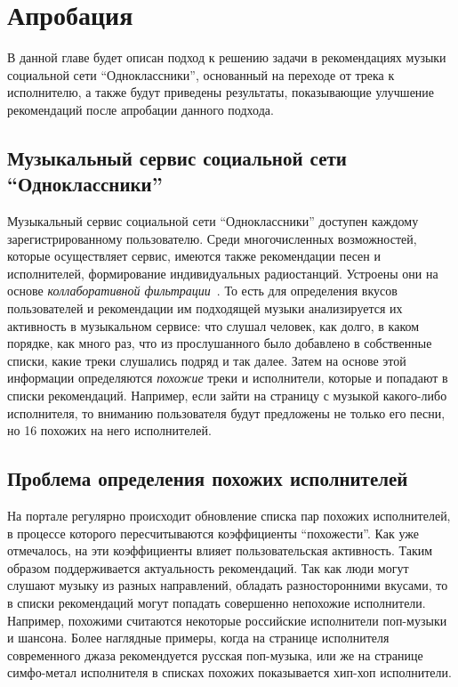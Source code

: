 \chapter{Апробация} 
\label{approbation}

В данной главе будет описан подход к решению задачи в рекомендациях музыки социальной сети ``Одноклассники'', основанный на переходе
от трека к исполнителю, а также будут приведены результаты, показывающие улучшение рекомендаций после апробации данного подхода.

\section{Музыкальный сервис социальной сети “Одноклассники”}

Музыкальный сервис социальной сети ``Одноклассники'' доступен каждому зарегистрированному пользователю. Среди многочисленных возможностей, 
которые осуществляет сервис, имеются также рекомендации песен и исполнителей, формирование индивидуальных радиостанций. Устроены они на 
основе \emph{коллаборативной фильтрации}~\cite{bugaychenko}. То есть для определения вкусов пользователей и рекомендации им подходящей музыки анализируется 
их активность в музыкальном сервисе: что слушал человек, как долго, в каком порядке, как много раз, что из прослушанного было добавлено 
в собственные списки, какие треки слушались подряд и так далее. Затем на основе этой информации определяются \emph{похожие} треки и исполнители,
которые и попадают в списки рекомендаций. Например, если зайти на страницу с музыкой какого-либо исполнителя, то вниманию пользователя будут 
предложены не только его песни, но 16 похожих на него исполнителей.

\section{Проблема определения похожих исполнителей}

На портале регулярно происходит обновление списка пар похожих исполнителей, в процессе которого пересчитываются коэффициенты ``похожести''.
Как уже отмечалось, на эти коэффициенты влияет пользовательская активность. Таким образом поддерживается актуальность рекомендаций.
Так как люди могут слушают музыку из разных направлений, обладать разносторонними вкусами, то в списки рекомендаций могут попадать совершенно
непохожие исполнители. Например, похожими считаются некоторые российские исполнители поп-музыки и шансона. 
Более наглядные примеры, когда на странице исполнителя современного джаза рекомендуется русская поп-музыка, или же 
на странице симфо-метал исполнителя в списках похожих показывается хип-хоп исполнители.

